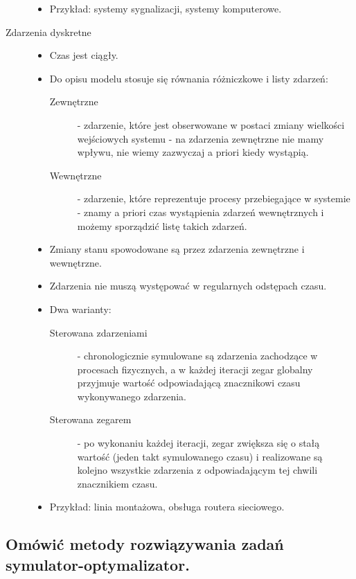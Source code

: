 \begin{description}
\begin{itemize}
        \item Przykład: systemy sygnalizacji, systemy komputerowe.
    \end{itemize}
    \item[Zdarzenia dyskretne]\mbox{}
    \begin{itemize}
        \item Czas jest ciągły.
        \item Do opisu modelu stosuje się równania różniczkowe i listy zdarzeń:\mbox{}
        \begin{description}
            \item[Zewnętrzne] - zdarzenie, które jest obserwowane w postaci zmiany wielkości wejściowych systemu - na zdarzenia zewnętrzne nie mamy wpływu, nie wiemy zazwyczaj a priori kiedy wystąpią.
            \item[Wewnętrzne] - zdarzenie, które reprezentuje procesy przebiegające w systemie - znamy a priori czas wystąpienia zdarzeń wewnętrznych i możemy sporządzić listę takich zdarzeń.
        \end{description}
        \item Zmiany stanu spowodowane są przez zdarzenia zewnętrzne i wewnętrzne.
        \item Zdarzenia nie muszą występować w regularnych odstępach czasu.
        \item Dwa warianty:\mbox{}
        \begin{description}
            \item[Sterowana zdarzeniami] - chronologicznie symulowane są zdarzenia zachodzące w procesach fizycznych, a w każdej iteracji zegar globalny przyjmuje wartość odpowiadającą znacznikowi czasu wykonywanego zdarzenia.
            \item[Sterowana zegarem] - po wykonaniu każdej iteracji, zegar zwiększa się o stałą wartość (jeden takt symulowanego czasu) i realizowane są kolejno wszystkie zdarzenia z odpowiadającym tej chwili znacznikiem czasu.
        \end{description}
        \item Przykład: linia montażowa, obsługa routera sieciowego.
    \end{itemize}
\end{description}

\subsection{Omówić metody rozwiązywania zadań symulator-optymalizator.}

